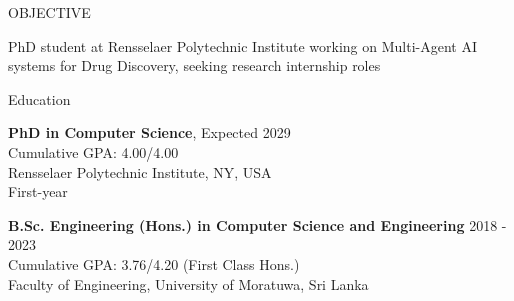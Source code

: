 \documentclass{resume} %
\begin{document}

\begin{rSection}{OBJECTIVE}

{PhD student at Rensselaer Polytechnic Institute working on Multi-Agent AI systems for Drug Discovery, seeking research internship roles}

\end{rSection}

\begin{rSection}{Education}

{\bf PhD in Computer Science}, \hfill {Expected 2029}\\
Cumulative GPA: 4.00/4.00\\
Rensselaer Polytechnic Institute, NY, USA \\
First-year 

{\bf B.Sc. Engineering (Hons.) in Computer Science and Engineering} \hfill {2018 - 2023}\\
Cumulative GPA: 3.76/4.20 (First Class Hons.) \\
Faculty of Engineering,
University of Moratuwa, Sri Lanka 
\end{rSection}


\end{document}
